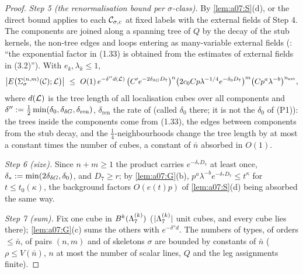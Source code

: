 \begin{proof}
\emph{Step 5 (the renormalisation bound per $\sigma$-class).} By \cref{lem:a07:S}(d), \cite[(1.33)]{Ba3} or the direct bound applies to each $\mathcal C_{\sigma,c}$ at fixed labels with the external fields of Step 4. The components are joined along a spanning tree of $Q$ by the decay of the stub kernels, the non-tree edges and loops entering as many-variable external fields (\cite[(3.2), p.~432]{Ba3}: ``the exponential factor in (1.33) is obtained from the estimates of external fields in (3.2)''). With $e_k,\lambda_k\le1$,
\[
\big|E\big(\Sigma^{(n,m)}_\sigma(\cC);\cL\big)\big|\ \le\ O(1)\,e^{-\delta''d(\cL)}\,\big(C'e^{-2\delta_{\dG}D_7}\big)^{n}\big(2c_0Cp\lambda^{-1/4}e^{-\delta_0D_7}\big)^{m}\big(Cp^a\lambda^{-b}\big)^{n_{\mathrm{ext}}},
\]
where $d(\mathcal L)$ is the tree length of all localisation cubes over all components and $\delta'':=\frac12\min(\delta_0,\delta_{\delta G},\delta_{\mathrm{ren}})$, $\delta_{\mathrm{ren}}$ the rate of \cite[(1.33)]{Ba3} (called $\delta_0$ there; it is not the $\delta_0$ of \textup{(P1)}): the trees inside the components come from (1.33), the edges between components from the stub decay, and the $\frac14$-neighbourhoods change the tree length by at most a constant times the number of cubes, a constant of $\bar n$ absorbed in $O(1)$.

\emph{Step 6 (size).} Since $n+m\ge1$ the product carries $e^{-\delta_*D_7}$ at least once, $\delta_*:=\min(2\delta_{\delta G},\delta_0)$, and $D_7\ge r$; by \cref{lem:a07:G}(b), $p^a\lambda^{-b}e^{-\delta_*D_7}\le t^\kappa$ for $t\le t_0(\kappa)$, the background factors $O(e(t)p)$ of \cref{lem:a07:S}(d) being absorbed the same way.

\emph{Step 7 (sum).} Fix one cube in $B^k(\Lambda^{(k)}_{7})$ ($|\Lambda^{(k)}_{7}|$ unit cubes, and every cube lies there); \cref{lem:a07:G}(c) sums the others with $e^{-\delta''d}$. The numbers of types, of orders $\le\bar n$, of pairs $(n,m)$ and of skeletons $\sigma$ are bounded by constants of $\bar n$ ($\rho\le V(\bar n)$, $n$ at most the number of scalar lines, $Q$ and the leg assignments finite).
\end{proof}

